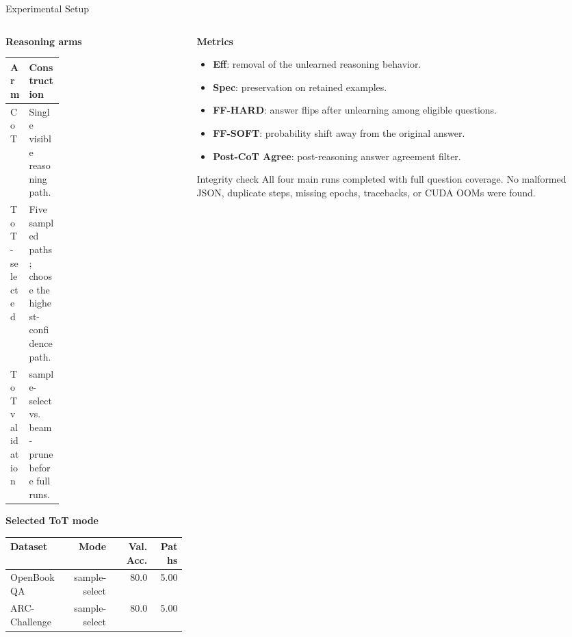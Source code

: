 \documentclass[aspectratio=169,10pt]{beamer}
\newcommand{\metric}[1]{\textbf{#1}}
\begin{document}
\begin{frame}{Experimental Setup}
\small
\begin{columns}[T,onlytextwidth]
  \begin{column}{0.50\textwidth}
    \textbf{Reasoning arms}

    \vspace{0.35em}
    \begin{tabularx}{\linewidth}{p{0.30\linewidth}>{\raggedright\arraybackslash}X}
      \toprule
      Arm & Construction \\
      \midrule
      CoT & Single visible reasoning path. \\
      ToT-selected & Five sampled paths; choose the highest-confidence path. \\
      ToT validation & sample-select vs. beam-prune before full runs. \\
      \bottomrule
    \end{tabularx}

    \vspace{0.8em}
    \textbf{Selected ToT mode}

    \vspace{0.25em}
    \scriptsize
    \begin{tabularx}{\linewidth}{X r r r}
      \toprule
      Dataset & Mode & Val. Acc. & Paths \\
      \midrule
      OpenBookQA & sample-select & 80.0 & 5.00 \\
      ARC-Challenge & sample-select & 80.0 & 5.00 \\
      \bottomrule
    \end{tabularx}
  \end{column}

  \begin{column}{0.47\textwidth}
    \textbf{Metrics}

    \vspace{0.35em}
    \begin{itemize}
      \item \metric{Eff}: removal of the unlearned reasoning behavior.
      \item \metric{Spec}: preservation on retained examples.
      \item \metric{FF-HARD}: answer flips after unlearning among eligible questions.
      \item \metric{FF-SOFT}: probability shift away from the original answer.
      \item \metric{Post-CoT Agree}: post-reasoning answer agreement filter.
    \end{itemize}

    \vspace{0.6em}
    \begin{block}{Integrity check}
      All four main runs completed with full question coverage. No malformed
      JSON, duplicate steps, missing epochs, tracebacks, or CUDA OOMs were found.
    \end{block}
  \end{column}
\end{columns}
\end{frame}
\end{document}
